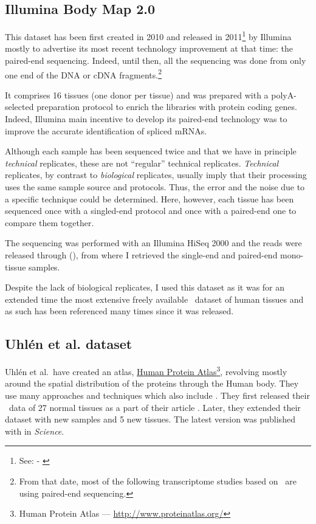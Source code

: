 \subsection{Illumina Body Map 2.0}
\label{subsec:ibmpresentation}
This dataset has been first created in 2010 and released in
2011\footnote{See:  - \cite{ibmEnsembl}} by Illumina
mostly to advertise its most recent technology improvement at that time:
the paired-end sequencing. Indeed, until then, all the sequencing was done
from only one end of the \gls{DNA} or \gls{cDNA} fragments.\footnote{From that
date, most of the following transcriptome studies based on \Rnaseq\ are using
paired-end sequencing.}

It comprises 16 tissues (one donor per tissue) and was prepared with a
polyA-selected preparation protocol to enrich the libraries with protein
coding genes. Indeed, Illumina main incentive to develop its paired-end
technology was to improve the accurate identification of spliced \glspl{mRNA}.

Although each sample has been sequenced twice and that we have in principle
\emph{technical} replicates, these are not ``regular'' technical replicates.
\emph{Technical} replicates, by contrast to \emph{biological} replicates,
usually imply that their processing uses the same sample source and protocols.
Thus, the error and the noise due to a specific technique could be determined.
Here, however, each tissue has been sequenced once with a singled-end protocol
and once with a paired-end one to compare them together.

The sequencing was performed with an Illumina HiSeq 2000 and the reads were
released through  (), from where I
retrieved the single-end and paired-end mono-tissue samples.

Despite the lack of biological replicates, I used this dataset as it was for an
extended time the most extensive freely available \Rnaseq\ dataset of human
tissues and as such has been referenced many times since it was released.

\subsection{Uhlén et al. dataset}
\label{subsec:uhlenPresentation}
Uhlén et al.\ have created an atlas,
\href{http://www.proteinatlas.org/}{Human Protein Atlas}\footnote{%
Human Protein Atlas ---
\href{http://www.proteinatlas.org/}{http://www.proteinatlas.org/}},
revolving mostly around the spatial
distribution of the proteins through the Human body. They use many approaches
and techniques which also include \Rnaseq. They first released their \Rnaseq\
data of 27 normal tissues as a part of their article 
\mycite{Uhlen2014}. Later, they extended their dataset with new samples and 5 new
tissues. The latest version was published with \paper{\citetitle{Uhlen2015}}
\mycite{Uhlen2015} in \textit{Science}.


